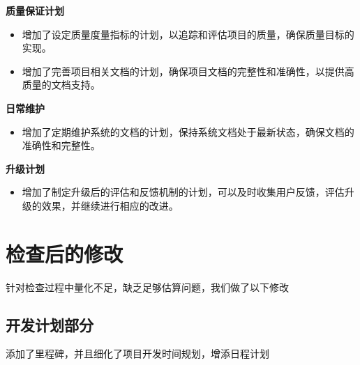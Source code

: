 \documentclass{article}
\begin{document}
\textbf{质量保证计划}
\begin{itemize}
	\item 增加了设定质量度量指标的计划，以追踪和评估项目的质量，确保质量目标的实现。
	\item 增加了完善项目相关文档的计划，确保项目文档的完整性和准确性，以提供高质量的文档支持。
\end{itemize}

\textbf{日常维护}
\begin{itemize}
	\item 增加了定期维护系统的文档的计划，保持系统文档处于最新状态，确保文档的准确性和完整性。
\end{itemize}

\textbf{升级计划}
\begin{itemize}
	\item 增加了制定升级后的评估和反馈机制的计划，可以及时收集用户反馈，评估升级的效果，并继续进行相应的改进。
\end{itemize}


\section{检查后的修改}
针对检查过程中量化不足，缺乏足够估算问题，我们做了以下修改
\subsection{开发计划部分}
添加了里程碑，并且细化了项目开发时间规划，增添日程计划
\end{document}
